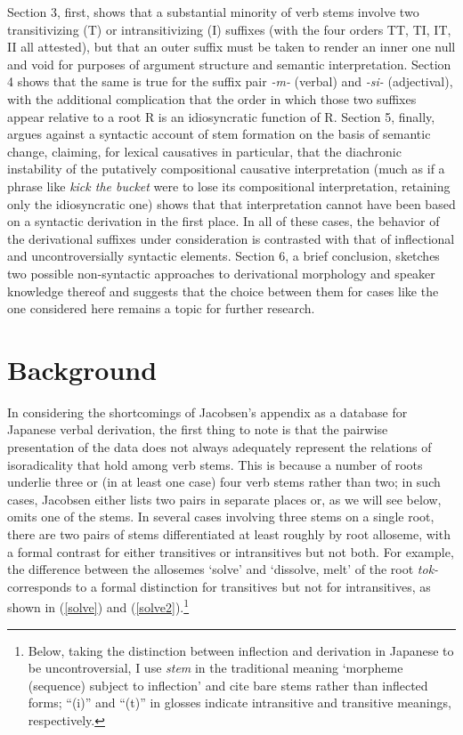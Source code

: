 \documentclass[output=paper,
modfonts
]{LSP/langsci}
\begin{document}
Section 3, first, shows that a substantial minority of verb stems
involve two transitivizing (T) or intransitivizing (I) suffixes (with
the four orders TT, TI, IT, II all attested), but that an outer suffix
must be taken to render an inner one null and void for purposes of
argument structure and semantic interpretation. Section 4 shows that the
same is true for the suffix pair \textit{-m-} (verbal) and \textit{-si-}
(adjectival), with the additional complication that the order in which
those two suffixes appear relative to a root R is an idiosyncratic
function of R. Section 5, finally, argues against a syntactic account of
stem formation on the basis of semantic change, claiming, for lexical
causatives in particular, that the diachronic instability of the
putatively compositional causative interpretation (much as if a phrase
like \textit{kick the bucket} were to lose its compositional
interpretation, retaining only the idiosyncratic one) shows that that
interpretation cannot have been based on a syntactic derivation in the
first place. In all of these cases, the behavior of the derivational
suffixes under consideration is contrasted with that of inflectional and
uncontroversially syntactic elements. Section 6, a brief conclusion,
sketches two possible non-syntactic approaches to derivational
morphology and speaker knowledge thereof and suggests that the choice
between them for cases like the one considered here remains a topic for
further research.

\section{Background}\label{background}

In considering the shortcomings of Jacobsen's \citeyearpar{jacobsen1982a,jacobsen1992a} appendix as a
database for Japanese verbal derivation, the first thing to note is that
the pairwise presentation of the data does not always adequately
represent the relations of isoradicality that hold among verb stems.
This is because a number of roots underlie three or (in at least one
case) four verb stems rather than two; in such cases, Jacobsen either
lists two pairs in separate places or, as we will see below, omits one
of the stems. In several cases involving three stems on a single root,
there are two pairs of stems differentiated at least roughly by root
alloseme, with a formal contrast for either transitives or intransitives
but not both. For example, the difference between the allosemes `solve'
and `dissolve, melt' of the root \textit{tok-} corresponds to a formal
distinction for transitives but not for intransitives, as shown in (\ref{solve})
and (\ref{solve2}).\footnote{Below, taking the distinction between inflection and
derivation in Japanese to be uncontroversial, I use \textit{stem} in the
traditional meaning `morpheme (sequence) subject to inflection' and cite
bare stems rather than inflected forms; ``(i)'' and ``(t)'' in glosses
indicate intransitive and transitive meanings, respectively.}
\end{document}
